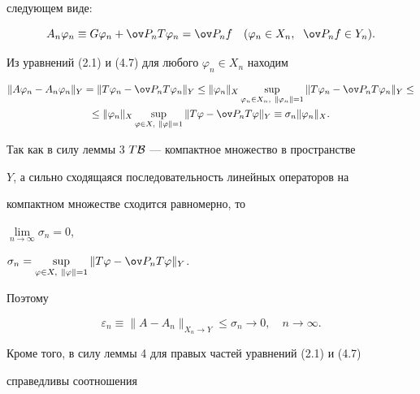 следующем виде:


\begin{equation}


A_n\varphi_n\equiv G\varphi_n+\ov P_nT\varphi_n=\ov P_nf\quad (\varphi_n


\in X_n,\ \; \ov P_nf\in Y_n). 


\end{equation}


Из уравнений (2.1) и (4.7) для любого $\varphi_n\in X_n$ находим


\begin{multline*}


\| A\varphi_n-A_n\varphi_n\|_Y=\| T\varphi_n-\ov P_nT


\varphi_n\|_Y\leq\|\varphi_n\|_X\sup_{\varphi_n\in X_n,\ \|


\varphi_n\|=1}\| T\varphi_n-\ov P_nT\varphi_n\|_Y\leq \\


%


\leq\|\varphi_n\|_X\sup_{\varphi\in X,\ \|\varphi\|=1}


\| T\varphi-\ov P_nT\varphi\|_Y\equiv\sigma_n\|


\varphi_n\|_X. 


\end{multline*}





Так как в силу леммы 3 $T\cal B$ --- компактное множество в пространстве


$Y$, а сильно сходящаяся последовательность линейных операторов на


компактном множестве сходится равномерно, то


$\lim\limits_{n\to\infty}\sigma_n=0$,


$\sigma_n=\sup\limits_{\varphi\in X,\ \|\varphi


\|=1}\| T\varphi-\ov P_nT\varphi\|_Y$. 


Поэтому


\begin{equation}


\varepsilon_n\equiv\| A-A_n\|_{X_n\to Y}\leq\sigma_n\to 0, \quad n\to


\infty. 


\end{equation}


Кроме того, в силу леммы 4 для правых частей уравнений (2.1) и (4.7)


справедливы соотношения


